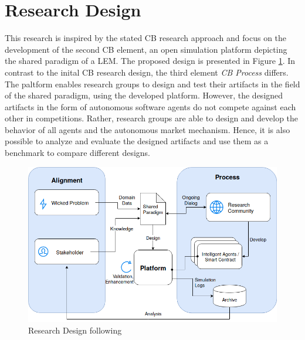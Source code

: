 \section{Research Design}
\label{sec:research_design}

This research is inspired by the stated CB research approach and focus on the development of 
the second CB element, an open simulation platform depicting the shared paradigm of a LEM. 
The proposed design is presented in Figure \ref{figure:competitive_benchmarking}. 
In contrast to the inital CB research design, the third element \textit{CB Process} differs. 
The paltform enables research groups to design and test their artifacts in the field of the shared 
paradigm, using the developed platform. However, the designed artifacts in the form of autonomous 
software agents do not compete against each other in competitions. 
Rather, research groups are able to design and develop the behavior of all agents and the 
autonomous market mechanism. Hence, it is also possible to analyze and evaluate the designed 
artifacts and use them as a benchmark to compare different designs. 

\begin{figure}[htbp]
	\centering
	\includegraphics[width=1\linewidth]{./figures/competitive_benchmarking.png}
	\caption{Research Design following \protect{}}
	\label{figure:competitive_benchmarking}
\end{figure}

